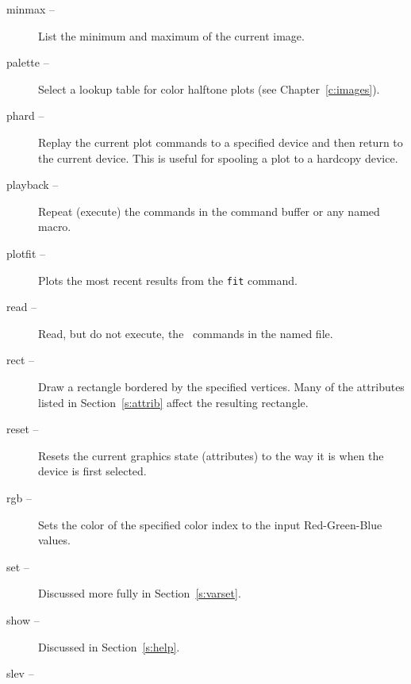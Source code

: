 \begin{description}
  \item [{minmax --}]%
    List the minimum and maximum of the current image.
  \item [{palette --}]%
    Select a lookup table for color halftone plots
    (see Chapter~\ref{c:images}).
  \item [{phard --}]%
    Replay the current plot commands to a specified device and then return to
    the current device.
    This is useful for spooling a plot to a hardcopy device.
  \item [{playback --}]%
    Repeat (execute) the commands in the command buffer
    or any named macro.
  \item [{plotfit --}]%
    Plots the most recent results from the 
    {\tt fit} command.
  \item [{read --}]%
    Read, but do not execute, the \wip\ commands in the named file.
  \item [{rect --}] Draw a rectangle bordered
    by the specified vertices.  Many of the attributes listed in
    Section~\ref{s:attrib} affect the resulting rectangle.
  \item [{reset --}] Resets the current
    graphics state (\ie attributes)
    to the way it is when the device is first selected.
  \item [{rgb --}] Sets
    the color of the specified color index to the input Red-Green-Blue values.
  \item [{set --}]%
    Discussed more fully in Section~\ref{s:varset}.
  \item [{show --}] Discussed in
    Section~\ref{s:help}.
  \item [{slev --}]%

\end{description}
